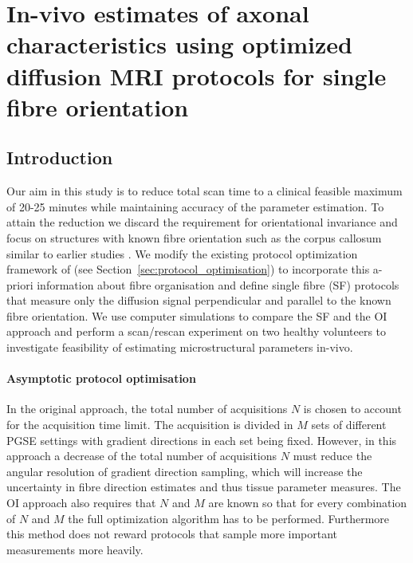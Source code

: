 \section{In-vivo estimates of axonal characteristics using optimized diffusion MRI protocols for single fibre orientation}
\subsection*{Introduction}
Our aim in this study is to reduce total scan time to a clinical feasible maximum of 20-25 minutes while maintaining accuracy of the parameter estimation. To attain the reduction we discard the requirement for orientational invariance and focus on structures with known fibre orientation such as the corpus callosum similar to earlier studies \citep{Assaf:2008,Barazany:2009}. We modify the existing protocol optimization framework of \cite{Alexander:2008} (see Section~\ref{sec:protocol_optimisation}) to incorporate this a-priori information about fibre organisation and define single fibre (SF) protocols that measure only the diffusion signal perpendicular and parallel to the known fibre orientation. We use computer simulations to compare the SF and the OI approach and perform a scan/rescan experiment on two healthy volunteers to investigate feasibility of estimating microstructural parameters in-vivo. 

\paragraph{Asymptotic protocol optimisation}
In the original approach, the total number of acquisitions $N$ is chosen to account for the acquisition time limit. The acquisition is divided in $M$ sets of different PGSE settings with gradient directions in each set being fixed. However, in this approach a decrease of the total number of acquisitions $N$ must reduce the angular resolution of gradient direction sampling, which will increase the uncertainty in fibre direction estimates and thus tissue parameter measures. The OI approach also requires that $N$ and $M$ are known so that for every combination of $N$ and $M$ the full optimization algorithm has to be performed. Furthermore this method does not reward protocols that sample more important measurements more heavily.

